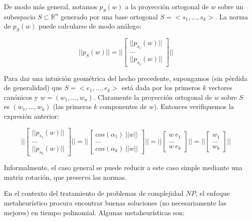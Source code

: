 \documentclass[10pt, a4paper, twocolumn]{article} %
\begin{document}
De modo más general, notamos $p_S(w)$ a la proyección ortogonal de $w$
sobre un subespacio $S \subset \mathbb{R}^n$ generado por una base 
ortogonal $S = <s_1, \dots, s_k>$. La norma de $p_S(w)$ puede calcularse
de modo análogo:

$$
||p_S(w)|| = ||\begin{bmatrix}
	||p_{s_1}(w)|| \\
	\dots \\
	||p_{s_k}(w)||
\end{bmatrix}||
$$

\smallskip

Para dar una intuición geométrica del hecho precedente, supongamos (sin 
pérdida de generalidad) que $S = <e_1, \dots, e_k>$ está dada por los 
primeros $k$ vectores canónicos y $w = (w_1, \dots, w_n)$. 
Claramente la proyección ortogonal de $w$ sobre $S$ es 
$(w_1, \dots, w_k)$ (las primeras $k$ componentes de $w$). Entonces 
verifiquemos la expresión anterior:

$$
||\begin{bmatrix}
	||p_{s_1}(w)|| \\	
	\dots \\
	||p_{s_k}(w)||
\end{bmatrix}|| = 
||\begin{bmatrix}
	cos(\alpha_1) \ ||w|| \\
	\dots \\
	cos(\alpha_k) \ ||w||
\end{bmatrix}|| = 
||\begin{bmatrix}
	w \ e_1 \\
	\dots \\
	w \ e_k
\end{bmatrix}|| =  
||\begin{bmatrix}
	w_1 \\
	\dots \\
	w_k
\end{bmatrix}||
$$

\smallskip

Informalmente, el caso general se puede reducir a este caso simple 
mediante una matriz rotación, que preserva las normas.

\bigskip


En el contexto del tratamiento de problemas de complejidad $NP$, el 
enfoque metaheurístico \cite{GP:2010,Talbi:2009} procura encontrar buenas soluciones (no 
necesariamente las mejores) en tiempo polinomial. Algunas 
metaheurísticas son:
\end{document}
